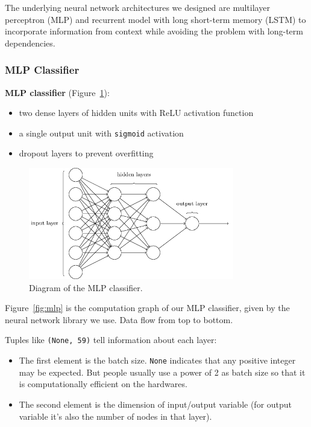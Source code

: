 \documentclass[11pt,a4paper,titlepage]{article}
\begin{document}
The underlying neural network architectures we designed are multilayer perceptron (MLP) and recurrent model with long short-term memory (LSTM) \cite{hochreiter1997long} to incorporate information from context while avoiding the problem with long-term dependencies.

\subsubsection{MLP Classifier}

\begin{mdframed}
\noindent \textbf{MLP classifier} (Figure~\ref{fig:mlp-draw}):
\begin{itemize}
  \item two dense layers of hidden units with ReLU \cite{nair2010rectified} activation function
  \item a single output unit with \texttt{sigmoid} activation
  \item dropout \cite{srivastava2014dropout} layers to prevent overfitting
\end{itemize}
\end{mdframed}

\begin{figure}[htbp]
  \centering
  \includegraphics[width=0.8\textwidth]{mlp.png}
  \caption{Diagram of the MLP classifier.} \label{fig:mlp-draw}
\end{figure}

Figure~\ref{fig:mlp} is the computation graph of our MLP classifier, given by the neural network library we use.
Data flow from top to bottom.

Tuples like \texttt{(None, 59)} tell information about each layer:

\begin{itemize}
  \item The first element is the batch size.
    \texttt{None} indicates that any positive integer may be expected.
    But people usually use a power of 2 as batch size so that it is computationally efficient on the hardwares.
  \item The second element is the dimension of input/output variable (for output variable it's also the number of nodes in that layer).
\end{itemize}
\end{document}
